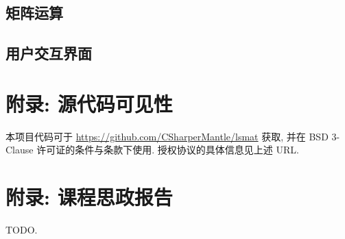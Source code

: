 



\subsection{矩阵运算}





\subsection{用户交互界面}



\section{附录: 源代码可见性}
\label{appendix_source_code}

本项目代码可于 \url{https://github.com/CSharperMantle/lsmat} 获取, 并在 BSD 3-Clause 许可证的条件与条款下使用. 授权协议的具体信息见上述 URL.

\section{附录: 课程思政报告}
\label{appendix_ideology}

TODO.

